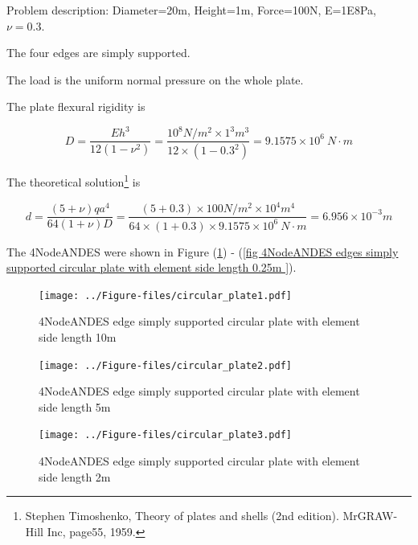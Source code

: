 \documentclass[fleqn,11pt]{article}
\begin{document}
Problem description: Diameter=20m, Height=1m, Force=100N, E=1E8Pa, $\nu=0.3$. 

The four edges are simply supported. 

The load is the uniform normal pressure on the whole plate. 


The plate flexural rigidity is 

\begin{equation}
  D=\frac{Eh^3}{12(1-\nu^2)}=\frac{10^8 N/m^2 \times 1^3 m^3 }{12 \times (1-0.3^2) }= 9.1575 \times 10^6 \ N\cdot m
\end{equation}

The theoretical solution\footnote{Stephen Timoshenko, Theory of plates and shells (2nd edition). MrGRAW-Hill Inc, page55, 1959.} is 

\begin{equation}
  d= \frac{(5+\nu)  q a^4}{64(1+\nu) D}=\frac{(5+0.3)\times 100 N/m^2 \times 10^4 m^4}{64\times(1+0.3) \times 9.1575 \times 10^6 \ N\cdot m}=6.956\times 10^{-3} m
\end{equation}


The 4NodeANDES were shown in Figure (\ref{fig 4NodeANDES edges simply supported circular plate with element side length 10m }) - (\ref{fig 4NodeANDES edges simply supported circular plate with element side length 0.25m }). 



\begin{figure}[H]
  \centering
  \texttt{[image: ../Figure-files/circular\_plate1.pdf]}
  \caption{4NodeANDES edge simply supported circular plate with element side length 10m }
  \label{fig 4NodeANDES edges simply supported circular plate with element side length 10m }
\end{figure}

\newpage

\begin{figure}[H]
  \centering
  \texttt{[image: ../Figure-files/circular\_plate2.pdf]}
  \caption{4NodeANDES edge simply supported circular plate with element side length 5m }
  \label{fig 4NodeANDES edges simply supported circular plate with element side length 5m }
\end{figure}


\begin{figure}[H]
  \centering
  \texttt{[image: ../Figure-files/circular\_plate3.pdf]}
  \caption{4NodeANDES edge simply supported circular plate with element side length 2m }
  \label{fig 4NodeANDES edges simply supported circular plate with element side length 2m }
\end{figure}
\end{document}
